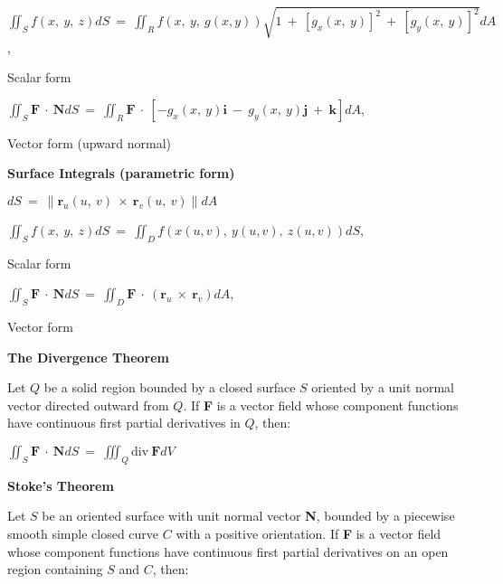\documentclass{article}
\begin{document}
\begin{large}
\hspace{0.2in} $\iint_{S}f(x,\ y,\ z)dS\ =\ \displaystyle\iint_{R}f(x,\ y,\ g(x,y))\sqrt{1\ +\ [g_{x}(x,\ y)]^{2}\ +\ [g_{y}(x,\ y)]^{2}}dA$, \begin{Large} Scalar form \end{Large}

\hspace{0.2in} $\iint_{S}\textbf{F}\ \cdot\ \textbf{N}dS\ =\ \displaystyle\iint_{R}\textbf{F}\ \cdot\ [-g_{x}(x,\ y)\textbf{i}\ -\ g_{y}(x,\ y)\textbf{j}\ +\ \textbf{k}]dA$, \begin{Large} Vector form (upward normal) \end{Large}

\hspace{0.1in} \textbf{Surface Integrals (parametric form)}

\hspace{0.2in} $dS\ =\ \|\textbf{r}_{u}(u,\ v)\ \times\ \textbf{r}_{v}(u,\ v)\|dA$

\hspace{0.2in} $\displaystyle\iint_{S}f(x,\ y,\ z)dS\ =\ \displaystyle\iint_{D}f(x(u,v),\ y(u,v),\ z(u,v))dS$, \begin{Large} Scalar form \end{Large}

\hspace{0.2in} $\displaystyle\iint_{S}\textbf{F}\ \cdot\ \textbf{N}dS\ =\ \displaystyle\iint_{D}\textbf{F}\ \cdot\ (\textbf{r}_{u}\ \times\ \textbf{r}_{v})dA$, \begin{Large} Vector form \end{Large}

\textbf{The Divergence Theorem}

\hspace{0.1in} Let $Q$ be a solid region bounded by a closed surface $S$ oriented by a unit normal vector directed outward from $Q$.  If \textbf{F} is a vector field whose component functions have continuous first partial derivatives in $Q$, then:

\hspace{2.5in} $\displaystyle\iint_{S}\textbf{F}\ \cdot\ \textbf{N}dS\ =\ \displaystyle\iiint_{Q}\text{div}\ \textbf{F}dV$

\vspace{2.0in}
\textbf{Stoke's Theorem}

\hspace{0.1in} Let $S$ be an oriented surface with unit normal vector \textbf{N}, bounded by a piecewise smooth simple closed curve $C$ with a positive orientation.  If \textbf{F} is a vector field whose component functions have continuous first partial derivatives on an open region containing $S$ and $C$, then:


\end{large}
\end{document}
